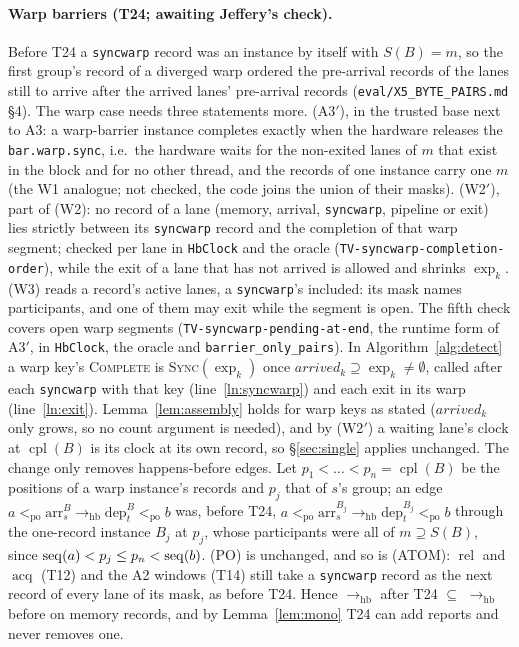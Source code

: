 \documentclass[11pt]{article}
\theoremstyle{remark}
\DeclareMathOperator{\rel}{rel}\DeclareMathOperator{\acq}{acq}\DeclareMathOperator{\key}{key}
\DeclareMathOperator{\cpl}{cpl}\DeclareMathOperator{\Exec}{Exec}\DeclareMathOperator{\rf}{rf}
\newcommand{\PO}{<_{\mathrm{po}}}\newcommand{\HB}{\to_{\mathrm{hb}}}\newcommand{\HBr}{\trianglelefteq_{\mathrm{hb}}}
\newcommand{\arr}[2]{\mathrm{arr}^{#2}_{#1}}\newcommand{\dep}[2]{\mathrm{dep}^{#2}_{#1}}\newcommand{\ext}[1]{\mathrm{exit}_{#1}}
\newcommand{\arrv}{\mathit{arrived}}\newcommand{\gone}{\mathit{exited}}\newcommand{\Rep}{\mathit{Rep}}
\begin{document}
\paragraph{Warp barriers (T24; awaiting Jeffery's check).} Before T24 a \texttt{syncwarp}
record was an instance by itself with $S(B)=m$, so the first group's record of a diverged warp
ordered the pre-arrival records of the lanes still to arrive after the arrived lanes'
pre-arrival records (\texttt{eval/X5\_BYTE\_PAIRS.md} \S4). The warp case needs three
statements more. (A3$'$), in the trusted base next to A3: a warp-barrier instance completes
exactly when the hardware releases the \texttt{bar.warp.sync}, i.e.\ the hardware waits for the
non-exited lanes of $m$ that exist in the block and for no other thread, and the records of one
instance carry one $m$ (the W1 analogue; not checked, the code joins the union of their masks).
(W2$'$), part of (W2): no record of a lane (memory, arrival, \texttt{syncwarp}, pipeline or exit)
lies strictly between its \texttt{syncwarp} record and the completion of that warp segment;
checked per lane in \texttt{HbClock} and the oracle (\texttt{TV-syncwarp-completion-order}),
while the exit of a lane that has not arrived is allowed and shrinks $\exp_k$. (W3) reads a
record's active lanes, a \texttt{syncwarp}'s included: its mask names participants, and one of
them may exit while the segment is open. The fifth check covers open warp segments
(\texttt{TV-syncwarp-pending-at-end}, the runtime form of A3$'$, in \texttt{HbClock}, the oracle
and \texttt{barrier\_only\_pairs}). In Algorithm~\ref{alg:detect} a warp key's
\textsc{Complete} is \textsc{Sync}$(\exp_k)$ once $\arrv_k\supseteq\exp_k\ne\emptyset$, called
after each \texttt{syncwarp} with that key (line~\ref{ln:syncwarp}) and each exit in its warp
(line~\ref{ln:exit}). Lemma~\ref{lem:assembly} holds for warp keys as stated ($\arrv_k$ only
grows, so no count argument is needed), and by (W2$'$) a waiting lane's clock at $\cpl(B)$ is
its clock at its own record, so \S\ref{sec:single} applies unchanged. The change only removes
happens-before edges. Let $p_1<\dots<p_n=\cpl(B)$ be the positions of a warp instance's
records and $p_j$ that of $s$'s group; an edge $a\PO\arr{s}{B}\HB\dep{t}{B}\PO b$ was, before
T24, $a\PO\arr{s}{B_j}\HB\dep{t}{B_j}\PO b$ through the one-record instance $B_j$ at $p_j$, whose
participants were all of $m\supseteq S(B)$, since $\operatorname{seq}(a)<p_j\le p_n<\operatorname{seq}(b)$. (PO) is
unchanged, and so is (ATOM): $\rel$ and $\acq$ (T12) and the A2 windows (T14) still take a
\texttt{syncwarp} record as the next record of every lane of its mask, as before T24. Hence
$\HB$ after T24 $\subseteq$ $\HB$ before on memory records, and by
Lemma~\ref{lem:mono} T24 can add reports and never removes one.
\end{document}

